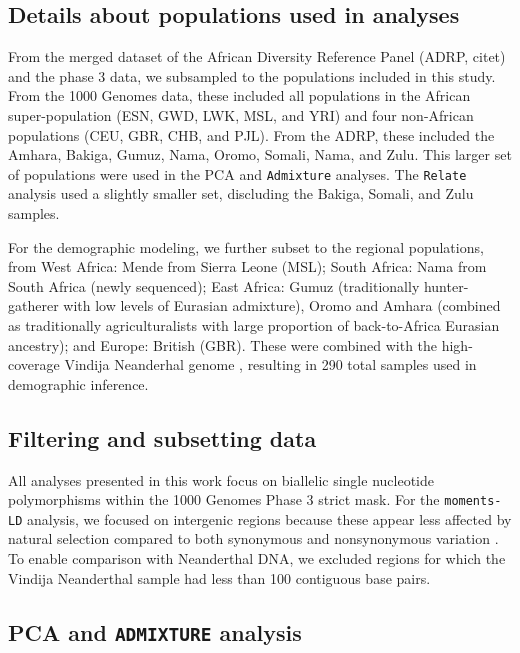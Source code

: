 \documentclass[]{article}
\begin{document}
\subsection{Details about populations used in analyses}

From the merged dataset of the African Diversity Reference Panel (ADRP,
citet{}) and the \citet{1000_Genomes_Project_Consortium2015-zq} phase 3 data,
we subsampled to the populations included in this study. From the 1000 Genomes
data, these included all populations in the African super-population (ESN, GWD,
LWK, MSL, and YRI) and four non-African populations (CEU, GBR, CHB, and PJL).
From the ADRP, these included the Amhara, Bakiga, Gumuz, Nama, Oromo, Somali,
Nama, and Zulu. This larger set of populations were used in the PCA and
\texttt{Admixture} analyses. The \texttt{Relate} analysis used a slightly
smaller set, discluding the Bakiga, Somali, and Zulu samples.

For the demographic modeling, we further subset to the regional populations,
from West Africa: Mende from Sierra Leone (MSL); South Africa: Nama from South
Africa (newly sequenced); East Africa: Gumuz (traditionally hunter-gatherer
with low levels of Eurasian admixture), Oromo and Amhara (combined as
traditionally agriculturalists with large proportion of back-to-Africa Eurasian
ancestry); and Europe: British (GBR). These were combined with the
high-coverage Vindija Neanderhal genome \citep{Prufer2017-kk}, resulting in 290
total samples used in demographic inference.

\subsection{Filtering and subsetting data}

All analyses presented in this work focus on biallelic single nucleotide
polymorphisms within the 1000 Genomes Phase 3 strict mask.  For the
\texttt{moments-LD} analysis, we focused on intergenic regions because these
appear less affected by natural selection compared to both synonymous and
nonsynonymous variation \citep{Ragsdale2018-dd}. To enable comparison with
Neanderthal DNA, we excluded regions for which the Vindija Neanderthal sample
had less than 100 contiguous base pairs. 

\subsection{PCA and \texttt{ADMIXTURE} analysis}
\end{document}
